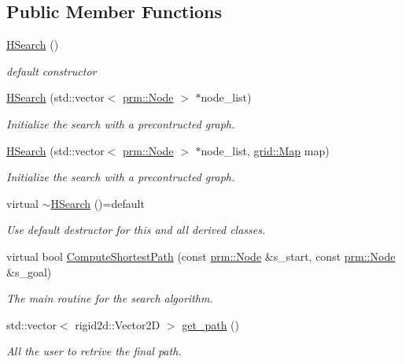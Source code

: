 \subsection*{Public Member Functions}
\begin{DoxyCompactItemize}
\item 
\mbox{\label{classhsearch_1_1HSearch_a88c750ab9e6c9ad303f468ef270619c3}} 
\hyperlink{classhsearch_1_1HSearch_a88c750ab9e6c9ad303f468ef270619c3}{H\+Search} ()
\begin{DoxyCompactList}\small\item\em default constructor \end{DoxyCompactList}\item 
\hyperlink{classhsearch_1_1HSearch_a52aed9d8d8c634bd506cfd3c14620884}{H\+Search} (std\+::vector$<$ \hyperlink{structprm_1_1Node}{prm\+::\+Node} $>$ $\ast$node\+\_\+list)
\begin{DoxyCompactList}\small\item\em Initialize the search with a precontructed graph. \end{DoxyCompactList}\item 
\hyperlink{classhsearch_1_1HSearch_a5342d4b1648868b600de6f2dda2e6fdc}{H\+Search} (std\+::vector$<$ \hyperlink{structprm_1_1Node}{prm\+::\+Node} $>$ $\ast$node\+\_\+list, \hyperlink{structgrid_1_1Map}{grid\+::\+Map} map)
\begin{DoxyCompactList}\small\item\em Initialize the search with a precontructed graph. \end{DoxyCompactList}\item 
\mbox{\label{classhsearch_1_1HSearch_ab48be1a6bdbd923ce5e83f6b39323941}} 
virtual \hyperlink{classhsearch_1_1HSearch_ab48be1a6bdbd923ce5e83f6b39323941}{$\sim$\+H\+Search} ()=default
\begin{DoxyCompactList}\small\item\em Use default destructor for this and all derived classes. \end{DoxyCompactList}\item 
virtual bool \hyperlink{classhsearch_1_1HSearch_a8641b99479bbdf017bf5a1168b763c27}{Compute\+Shortest\+Path} (const \hyperlink{structprm_1_1Node}{prm\+::\+Node} \&s\+\_\+start, const \hyperlink{structprm_1_1Node}{prm\+::\+Node} \&s\+\_\+goal)
\begin{DoxyCompactList}\small\item\em The main routine for the search algorithm. \end{DoxyCompactList}\item 
std\+::vector$<$ rigid2d\+::\+Vector2D $>$ \hyperlink{classhsearch_1_1HSearch_a2dbcfc312e89d60d9ec9b85eef271cbf}{get\+\_\+path} ()
\begin{DoxyCompactList}\small\item\em All the user to retrive the final path. \end{DoxyCompactList}\end{DoxyCompactItemize}
